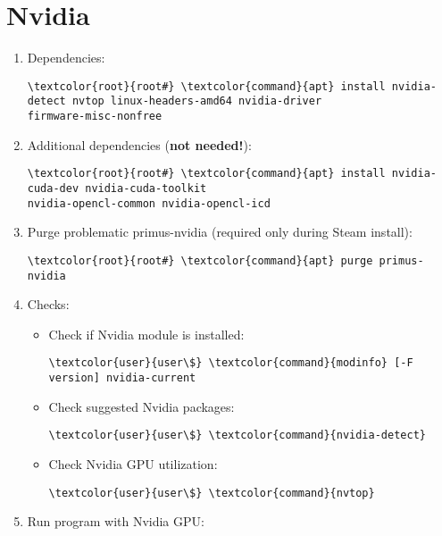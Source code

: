 \documentclass[10pt, a4paper, onecolumn, openany]{book} %
\begin{document}
\section{Nvidia}
\begin{enumerate}
    \item Dependencies:
\begin{Verbatim}[commandchars=\\\{\}]
\textcolor{root}{root#} \textcolor{command}{apt} install nvidia-detect nvtop linux-headers-amd64 nvidia-driver
firmware-misc-nonfree
\end{Verbatim}    
    \item Additional dependencies (\textbf{not needed!}):
\begin{Verbatim}[commandchars=\\\{\}]
\textcolor{root}{root#} \textcolor{command}{apt} install nvidia-cuda-dev nvidia-cuda-toolkit 
nvidia-opencl-common nvidia-opencl-icd
\end{Verbatim}
    \item Purge problematic primus-nvidia (required only during Steam install):
\begin{Verbatim}[commandchars=\\\{\}]
\textcolor{root}{root#} \textcolor{command}{apt} purge primus-nvidia
\end{Verbatim}
    \item Checks:
\begin{itemize}
    \item Check if Nvidia module is installed:
\begin{Verbatim}[commandchars=\\\{\}]
\textcolor{user}{user\$} \textcolor{command}{modinfo} [-F version] nvidia-current
\end{Verbatim}
    \item Check suggested Nvidia packages:
\begin{Verbatim}[commandchars=\\\{\}]
\textcolor{user}{user\$} \textcolor{command}{nvidia-detect}
\end{Verbatim}
    \item Check Nvidia GPU utilization:
\begin{Verbatim}[commandchars=\\\{\}]
\textcolor{user}{user\$} \textcolor{command}{nvtop}
\end{Verbatim}
\end{itemize}
    \item Run program with Nvidia GPU:
\begin{itemize}

\end{itemize}
\end{enumerate}
\end{document}
